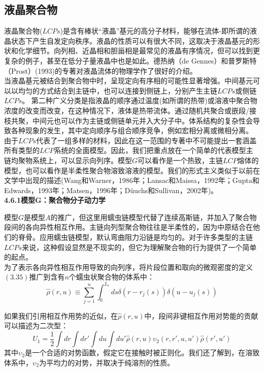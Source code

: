 \subsection{液晶聚合物}

液晶聚合物($LCPs$)是含有棒状“液晶”基元的高分子材料，能够在流体-即所谓的液晶状态下产生自发定向秩序。液晶的性质可以有很大不同，这取决于液晶基元的形状和化学细节。向列相、近晶相和胆甾相是最常见的液晶有序情况，但可以找到更复杂的例子，甚至在低分子量液晶中也是如此。德热纳（de Gennes）和普罗斯特（Prost）(1993)的专著对液晶流体的物理学作了很好的介绍。\\

当液晶基元被结合到聚合物中时，呈现定向有序相的可能性显著增强。中间基元可以以均匀的方式结合到主链中，也可以连接到侧链上，分别产生主链$LCPs$或侧链$LCPs$。 第二种广义分类是指液晶的顺序通过温度(如所谓的热带)或溶液中聚合物浓度的改变而改变，在这种情况下，液体是热带流体。通过随机共聚合或嵌段/接枝共聚，中间元也可以作为主链或侧链单元并入大分子中。体系结构的复杂性会导致各种现象的发生，其中定向顺序与组合顺序竞争，例如宏相分离或微相分离。\\

由于$LCPs$代表了一组多样的材料，因此在这一范围的专著中不可能提出一套涵盖所有类型的$LCP$系统的全面模型。因此，我们把重点放在一个简单的代表模型主链均聚物系统上，可以显示向列序。模型$G$可以看作是一个热致，主链$LCP$熔体的模型，也可以看作是半柔性聚合物溶致溶液的模型。我们的形式主义类似于以前在文学中出现的描述(Wang和Warner，1986年；Lansac和Maissa，1992年；Gupta和Edwards，1993年；Matsen，1996年；Düuchs和Sullivan，2002年)。\\


\textbf{4.6.1模型G：聚合物分子动力学}

模型$G$是模型$A$的推广，但这里用蠕虫链模型代替了连续高斯链，并加入了聚合物段间的各向异性相互作用。主链向列型聚合物往往是半柔性的，因为中原结合在他们的脊骨。应用蠕虫链模型，默认弯曲阻力沿链是均匀的。对于许多类型的主链$LCPs$来说，这种假设显然是不现实的，但它为理解聚合物的行为提供了一个简单的起点。\\

为了表示各向异性相互作用导致的向列序，将片段位置和取向的微观密度的定义$(3.35)$推广到含有$n$个蠕虫状聚合物的体系中：\\
\begin{equation}
\hat{\rho}(r,u) \equiv \sum_{j=1}^{n} \int _{0}^{L_{c}} ds \delta(r-r_{j}(s)) \delta (u-u_{j}(s))
\end{equation}

如果我们引用相互作用势的近似，在$\hat{\rho}(r,u)$中，段间非键相互作用对势能的贡献可以描述为二次型：\\
\begin{equation}
U_1=\frac{1}{2} \int dr \int dr' \int du \int du' \hat{\rho}(r,u) \upsilon_2(r,r',u,u') \hat{\rho}(r',u')
\end{equation}
其中$\upsilon_2$是一个合适的对势函数，假定它在接触时被正则化。我们还了解到，在溶致体系中，$\upsilon_2$为平均力的对势，并取决于纯溶剂的性质。\\

